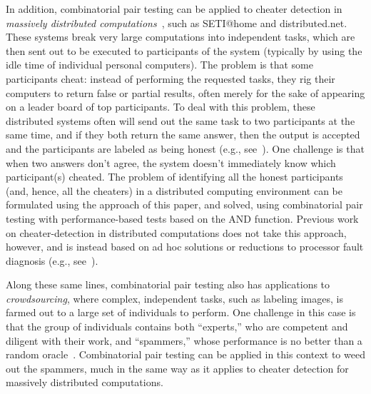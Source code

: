 \documentclass[11pt]{llncs}
\begin{document}
In addition, combinatorial pair testing can be applied to 
cheater detection in 
\emph{massively distributed computations}~\cite{Goodrich2008199}, such as 
SETI@home and distributed.net.
These systems break very large computations into 
independent tasks,
which are then sent out to be executed to participants of the system (typically by using the idle time of individual personal computers).
The problem is that some participants cheat: instead of performing the
requested tasks, they rig their computers to 
return false or partial results, often merely for the sake of appearing on a
leader board of top participants.
To deal with this problem, these distributed systems often will send out the
same task to two participants at the same time, and if they both return the
same answer, then the output is accepted and the participants are labeled as
being honest (e.g., see~\cite{dg-acns-05}).
One challenge is that when two answers don't agree, the system doesn't immediately know
which participant(s) cheated.
The problem of identifying all the honest participants (and, hence, all the cheaters)
in a distributed computing environment can be formulated using the approach of this paper, and solved, using combinatorial
pair testing with performance-based tests based on the AND function.
Previous work on cheater-detection in distributed computations does not take
this approach, however, and is instead based on ad hoc 
solutions or reductions to processor fault diagnosis
(e.g., see~\cite{dg-acns-05,Du:2004,Goodrich2008199}).

Along these same lines,
combinatorial pair testing also has applications to 
\emph{crowdsourcing}, where complex, independent tasks, such as labeling 
images, is farmed out to a large set of individuals to perform.
One challenge in this case is that the group of individuals contains 
both ``experts,''
who are competent and diligent with their work, and ``spammers,''
whose performance is no better than a random oracle~\cite{NIPS2012_0328}.
Combinatorial pair testing can be applied in this context to weed
out the spammers, much in the same way
as it applies to cheater detection for massively distributed computations.
\end{document}
